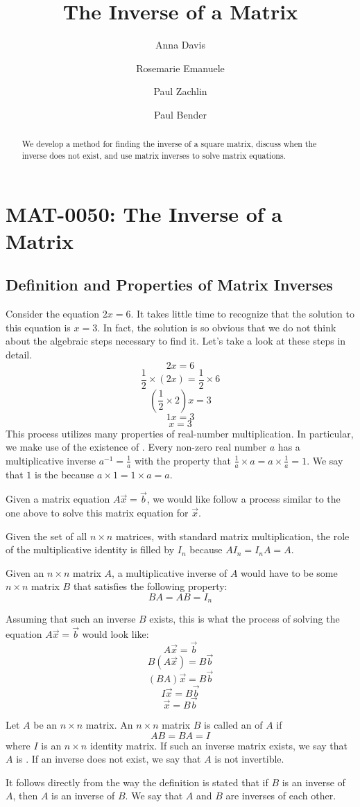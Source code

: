 \documentclass{ximera}
\author{Anna Davis \and Rosemarie Emanuele \and Paul Zachlin \and Paul Bender} \title{The Inverse of a Matrix} \license{CC-BY 4.0}
\begin{document}
\begin{abstract}
 We develop a method for finding the inverse of a square matrix, discuss when the inverse does not exist, and use matrix inverses to solve matrix equations.
\end{abstract}
\maketitle
\section*{MAT-0050:  The Inverse of a Matrix}
\subsection*{Definition and Properties of Matrix Inverses}
Consider the equation $2x=6$.  It takes little time to recognize that the solution to this equation is $x=3$.  In fact, the solution is so obvious that we do not think about the algebraic steps necessary to find it.  Let's take a look at these steps in detail.
$$2x=6$$
$$\frac{1}{2}\times (2x)=\frac{1}{2}\times 6$$
$$(\frac{1}{2}\times 2)x=3$$
$$1x=3$$
$$x=3$$
This process utilizes many properties of real-number multiplication.  In particular, we make use of the existence of .  Every non-zero real number $a$  has a multiplicative inverse $a^{-1}=\frac{1}{a}$ with the property that $\frac{1}{a}\times a=a\times \frac{1}{a}=1$.  We say that $1$ is the  because $a\times 1=1\times a=a$.

Given a matrix equation $A\vec{x}=\vec{b}$, we would like follow a process similar to the one above to solve this matrix equation for $\vec{x}$.  

Given the set of all $n\times n$ matrices, with standard matrix multiplication, the role of the multiplicative identity is filled by $I_n$ because $AI_n=I_nA=A$. 

Given an $n\times n$ matrix $A$, a multiplicative inverse of $A$ would have to be some $n\times n$ matrix $B$ that satisfies the following property:
$$BA=AB=I_n$$

Assuming that such an inverse $B$ exists, this is what the process of solving the equation $A\vec{x}=\vec{b}$ would look like:
$$A\vec{x}=\vec{b}$$
$$B(A\vec{x})=B\vec{b}$$
$$(BA)\vec{x}=B\vec{b}$$
$$I\vec{x}=B\vec{b}$$
$$\vec{x}=B\vec{b}$$

\begin{definition}\label{def:matinverse}
Let $A$ be an $n\times n$ matrix.  An $n\times n$ matrix $B$ is called an  of $A$ if 
$$AB=BA=I$$
where $I$ is an $n\times n$ identity matrix.  If such an inverse matrix exists, we say that $A$ is .  If an inverse does not exist, we say that $A$ is not invertible.
\end{definition}
It follows directly from the way the definition is stated that if $B$ is an inverse of $A$, then $A$ is an inverse of $B$. We say that $A$ and $B$ are inverses of each other.
\end{document}
